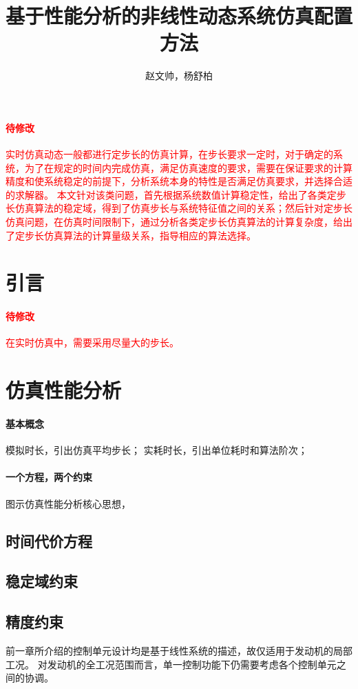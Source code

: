 \documentclass{article}
\title{基于性能分析的非线性动态系统仿真配置方法}
\author{赵文帅，杨舒柏}
\begin{document}
\maketitle

\abstract

\textcolor{red}{
\paragraph{待修改}
实时仿真动态一般都进行定步长的仿真计算，在步长要求一定时，对于确定的系统，为了在规定的时间内完成仿真，满足仿真速度的要求，需要在保证要求的计算精度和使系统稳定的前提下，分析系统本身的特性是否满足仿真要求，并选择合适的求解器。
本文针对该类问题，首先根据系统数值计算稳定性，给出了各类定步长仿真算法的稳定域，得到了仿真步长与系统特征值之间的关系；然后针对定步长仿真问题，在仿真时间限制下，通过分析各类定步长仿真算法的计算复杂度，给出了定步长仿真算法的计算量级关系，指导相应的算法选择。
}

\section{引言}
\textcolor{red}{
\paragraph{待修改}
在实时仿真中，需要采用尽量大的步长。
}

\section{仿真性能分析}
\label{sec:1_simprefanaly}
\paragraph{基本概念}
模拟时长，引出仿真平均步长；
实耗时长，引出单位耗时和算法阶次；

\paragraph{一个方程，两个约束}
图示仿真性能分析核心思想，

\subsection{时间代价方程}
\subsection{稳定域约束}
\subsection{精度约束}
前一章所介绍的控制单元设计均是基于线性系统的描述，故仅适用于发动机的局部工况。
对发动机的全工况范围而言，单一控制功能下仍需要考虑各个控制单元之间的协调。
\end{document}

